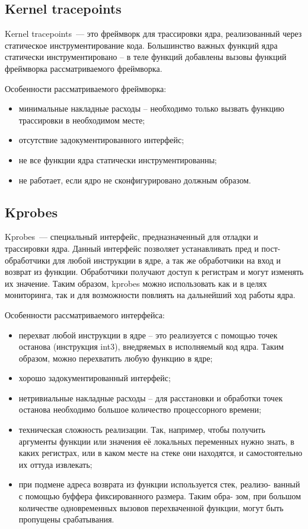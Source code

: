 \subsection{Kernel tracepoints}%


Kernel tracepoints~--- это фреймворк для трассировки ядра, реализованный через статическое инструментирование кода. Большинство
важных функций ядра статически инструментировано – в теле функций
добавлены вызовы функций фреймворка рассматриваемого фреймворка.

Особенности рассматриваемого фреймворка:

\begin{itemize}
	\item минимальные накладные расходы – необходимо только вызвать функцию трассировки в необходимом месте;
	\item отсутствие задокументированного интерфейс;
	\item не все функции ядра статически инструментированны;
	\item не работает, если ядро не сконфигурировано должным образом.
\end{itemize}

\subsection{Kprobes}%
\label{sub:kprobes}

Kprobes~--- специальный интерфейс, предназначенный для отладки
и трассировки ядра. Данный интерфейс позволяет устанавливать пред и
пост-обработчики для любой инструкции в ядре, а так же обработчики на
вход и возврат из функции. Обработчики получают доступ к регистрам и
могут изменять их значение. Таким образом, kprobes можно использовать
как и в целях мониторинга, так и для возможности повлиять на дальнейший ход работы ядра.

Особенности рассматриваемого интерфейса:

\begin{itemize}
	\item перехват любой инструкции в ядре – это реализуется с помощью точек останова (инструкция int3), внедряемых в исполняемый код ядра. Таким образом, можно перехватить любую функцию в ядре;
	\item хорошо задокументированный интерфейс;
	\item нетривиальные накладные расходы – для расстановки и обработки
		точек останова необходимо большое количество процессорного времени;
	\item техническая сложность реализации. Так, например, чтобы получить
		аргументы функции или значения её локальных переменных нужно
		знать, в каких регистрах, или в каком месте на стеке они находятся,
		и самостоятельно их оттуда извлекать;
	\item при подмене адреса возврата из функции используется стек, реализо-
		ванный с помощью буффера фиксированного размера. Таким обра-
		зом, при большом количестве одновременных вызовов перехваченной
		функции, могут быть пропущены срабатывания.
\end{itemize}

